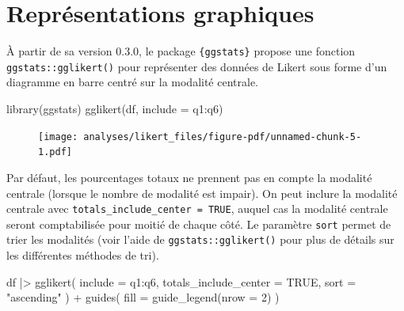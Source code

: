 \documentclass[
  letterpaper,
  DIV=11,
  numbers=noendperiod,
  oneside]{scrreprt}
\newenvironment{Shaded}{\begin{snugshade}}{\end{snugshade}}
\newcommand{\AttributeTok}[1]{\textcolor[rgb]{0.40,0.45,0.13}{#1}}
\newcommand{\ConstantTok}[1]{\textcolor[rgb]{0.56,0.35,0.01}{#1}}
\newcommand{\DecValTok}[1]{\textcolor[rgb]{0.68,0.00,0.00}{#1}}
\newcommand{\FunctionTok}[1]{\textcolor[rgb]{0.28,0.35,0.67}{#1}}
\newcommand{\NormalTok}[1]{\textcolor[rgb]{0.00,0.23,0.31}{#1}}
\newcommand{\SpecialCharTok}[1]{\textcolor[rgb]{0.37,0.37,0.37}{#1}}
\newcommand{\StringTok}[1]{\textcolor[rgb]{0.13,0.47,0.30}{#1}}
\begin{document}
\hypertarget{repruxe9sentations-graphiques-3}{%
\section{Représentations
graphiques}\label{repruxe9sentations-graphiques-3}}

À partir de sa version 0.3.0, le package \texttt{\{ggstats\}} propose
une fonction \texttt{ggstats::gglikert()} pour représenter des données
de Likert sous forme d'un diagramme en barre centré sur la modalité
centrale.

\begin{Shaded}
\begin{Highlighting}[]
\FunctionTok{library}\NormalTok{(ggstats)}
\FunctionTok{gglikert}\NormalTok{(df, }\AttributeTok{include =}\NormalTok{ q1}\SpecialCharTok{:}\NormalTok{q6)}
\end{Highlighting}
\end{Shaded}

\begin{figure}[H]

{\centering \texttt{[image: analyses/likert\_files/figure-pdf/unnamed-chunk-5-1.pdf]}

}

\end{figure}

Par défaut, les pourcentages totaux ne prennent pas en compte la
modalité centrale (lorsque le nombre de modalité est impair). On peut
inclure la modalité centrale avec
\texttt{totals\_include\_center\ =\ TRUE}, auquel cas la modalité
centrale seront comptabilisée pour moitié de chaque côté. Le paramètre
\texttt{sort} permet de trier les modalités (voir l'aide de
\texttt{ggstats::gglikert()} pour plus de détails sur les différentes
méthodes de tri).

\begin{Shaded}
\begin{Highlighting}[]
\NormalTok{df }\SpecialCharTok{|\textgreater{}} 
  \FunctionTok{gglikert}\NormalTok{(}
    \AttributeTok{include =}\NormalTok{ q1}\SpecialCharTok{:}\NormalTok{q6,}
    \AttributeTok{totals\_include\_center =} \ConstantTok{TRUE}\NormalTok{,}
    \AttributeTok{sort =} \StringTok{"ascending"}
\NormalTok{  ) }\SpecialCharTok{+}
  \FunctionTok{guides}\NormalTok{(}
    \AttributeTok{fill =} \FunctionTok{guide\_legend}\NormalTok{(}\AttributeTok{nrow =} \DecValTok{2}\NormalTok{)}
\NormalTok{  )}
\end{Highlighting}
\end{Shaded}
\end{document}
